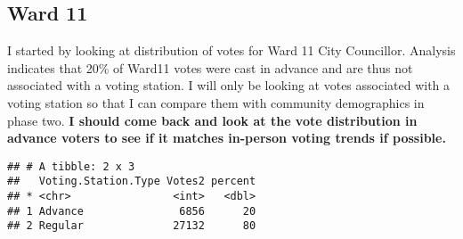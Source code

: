 \documentclass[
]{article}
\newenvironment{Shaded}{\begin{snugshade}}{\end{snugshade}}
\newcommand{\CommentTok}[1]{\textcolor[rgb]{0.56,0.35,0.01}{\textit{#1}}}
\newcommand{\DataTypeTok}[1]{\textcolor[rgb]{0.13,0.29,0.53}{#1}}
\newcommand{\DecValTok}[1]{\textcolor[rgb]{0.00,0.00,0.81}{#1}}
\newcommand{\KeywordTok}[1]{\textcolor[rgb]{0.13,0.29,0.53}{\textbf{#1}}}
\newcommand{\NormalTok}[1]{#1}
\newcommand{\OperatorTok}[1]{\textcolor[rgb]{0.81,0.36,0.00}{\textbf{#1}}}
\newcommand{\StringTok}[1]{\textcolor[rgb]{0.31,0.60,0.02}{#1}}
\begin{document}
\hypertarget{ward-11}{%
\subsection{Ward 11}\label{ward-11}}

I started by looking at distribution of votes for Ward 11 City
Councillor. Analysis indicates that 20\% of Ward11 votes were cast in
advance and are thus not associated with a voting station. I will only
be looking at votes associated with a voting station so that I can
compare them with community demographics in phase two. \textbf{I should
come back and look at the vote distribution in advance voters to see if
it matches in-person voting trends if possible.}

\begin{Shaded}
\end{Shaded}

\begin{verbatim}
## # A tibble: 2 x 3
##   Voting.Station.Type Votes2 percent
## * <chr>                <int>   <dbl>
## 1 Advance               6856      20
## 2 Regular              27132      80
\end{verbatim}
\end{document}
